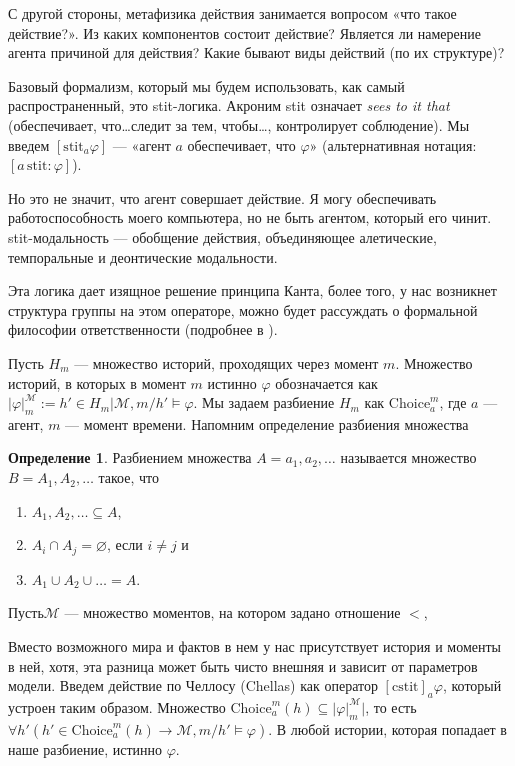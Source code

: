 \documentclass[openany]{book}
\theoremstyle{plain}
\theoremstyle{definition}
\newtheorem{defn}{Определение}[section]
\begin{document}
С другой стороны, метафизика действия занимается вопросом «что такое действие?». Из каких компонентов состоит действие? Является ли намерение агента причиной для действия? Какие бывают виды действий (по их структуре)?

Базовый формализм, который мы будем использовать, как самый распространенный, это stit-логика. Акроним stit означает \textit{sees to it that} (обеспечивает, что\dots следит за тем, чтобы\dots, контролирует соблюдение). Мы введем \([\mathrm{stit}_{a}\varphi]\) --- «агент \(a\) обеспечивает, что \(\varphi\)» (альтернативная нотация: \([a \,\mathrm{stit}: \varphi]\)).

Но это не значит, что агент совершает действие. Я могу обеспечивать работоспособность моего компьютера, но не быть агентом, который его чинит. stit-модальность --- обобщение действия, объединяющее алетические, темпоральные и деонтические модальности. 

Эта логика дает изящное решение принципа Канта, более того, у нас возникнет структура группы на этом операторе, можно будет рассуждать о формальной философии ответственности (подробнее в \cite{Duijf}).

Пусть \(H_m\) --- множество историй, проходящих через момент \(m\). Множество историй, в которых в момент \(m\) истинно \(\varphi\) обозначается как \(|\varphi|_m^{\mathcal{M}} := {h' \in H_m | \mathcal{M}, m/h' \models \varphi}\). Мы задаем разбиение \(H_m\) как \(\mathrm{Choice}_a^m\), где \(a\) --- агент, \(m\) --- момент времени. Напомним определение разбиения множества 
\begin{defn}
    Разбиением множества \(A = {a_1, a_2, \dots}\) называется множество \(B = {A_1, A_2, \dots}\) такое, что
    \begin{enumerate}
	\item \(A_1, A_2, \dots \subseteq A\),
	\item \(A_i \cap A_j = \varnothing\), если \(i \not= j\) и
	\item \(A_1 \cup A_2 \cup \dots = A\).
    \end{enumerate}
\end{defn}

Пусть\(\mathcal{M}\) --- множество моментов, на котором задано отношение \(<\), 

Вместо возможного мира и фактов в нем у нас присутствует история и моменты в ней, хотя, эта разница может быть чисто внешняя и зависит от параметров модели. Введем действие по Челлосу (Chellas) как оператор \([\mathrm{cstit}]_a \varphi\), который устроен таким образом. Множество \(\mathrm{Choice}_a^m (h) \subseteq |\varphi|_m^{\mathcal{M}}|\), то есть \(\forall h' (h' \in \mathrm{Choice}_a^m (h) \to \mathcal{M}, m/h' \models \varphi)\). В любой истории, которая попадает в наше разбиение, истинно \(\varphi\). 
\end{document}
